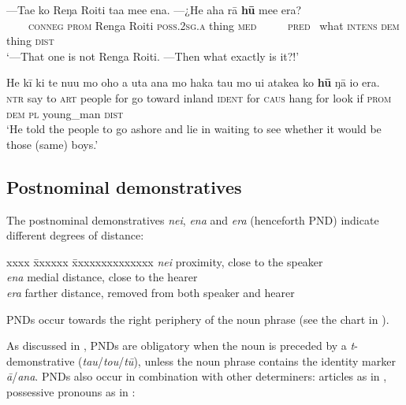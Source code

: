 \ea\label{ex:4.193}
\gll —Ta{\ꞌ}e ko Reŋa Roiti ta{\ꞌ}a me{\ꞌ}e ena. —¿He aha rā  \textbf{hū} me{\ꞌ}e era?\\
~~~~\textsc{conneg} \textsc{prom} Renga Roiti \textsc{poss.2sg.a} thing \textsc{med} ~~~~~\textsc{pred}~ what \textsc{intens}  \textsc{dem} thing \textsc{dist}\\

\glt 
‘—That one is not Renga Roiti. —Then what exactly is it?!’ \textstyleExampleref{[Ley-9-56.092–093]}
\z

\ea\label{ex:4.194}
\gll He kī ki te nu{\ꞌ}u mo oho a {\ꞌ}uta {\ꞌ}ana mo haka tau mo u{\ꞌ}i  {\ꞌ}atakea ko \textbf{hū} ŋā io era.\\
\textsc{ntr} say to \textsc{art} people for go toward inland \textsc{ident} for \textsc{caus} hang for look  if \textsc{prom} \textsc{dem} \textsc{pl} young\_man \textsc{dist}\\

\glt 
‘He told the people to go ashore and lie in waiting to see whether it would be those (same) boys.’ \textstyleExampleref{[R425.011]} 
\z

\subsection{Postnominal demonstratives} \label{sec:4.6.3}
The postnominal demonstratives \textit{nei}, \textit{ena} and \textit{era} (henceforth PND) indicate different degrees of distance:
\begin{tabbing}
xxxx \= xxxxxx \= xxxxxxxxxxxxxx\kill
\> \textit{nei} \>  proximity, close to the speaker\\
\> \textit{ena}\>   medial distance, close to the hearer\\
\> \textit{era} \>  farther distance, removed from both speaker and hearer
\end{tabbing}
PNDs occur towards the right periphery of the noun phrase (see the chart in ).

As discussed in , PNDs are obligatory when the noun is preceded by a \textit{t}{}-de\-mon\-stra\-tive (\textit{tau}/\textit{tou}/\textit{tū}), unless the noun phrase contains the identity marker \textit{{\ꞌ}ā}/\textit{{\ꞌ}ana}. PNDs also occur in combination with other determiners: articles as in , possessive pronouns as in :

